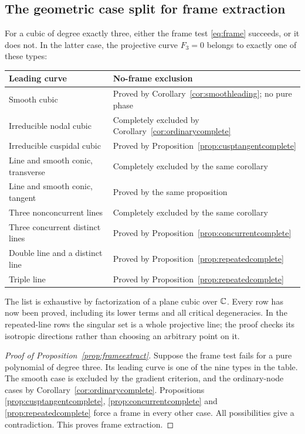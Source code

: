\subsection{The geometric case split for frame extraction}

For a cubic of degree exactly three, either the frame test
\eqref{eq:frame} succeeds, or it does not. In the latter case,
the projective curve $F_3=0$ belongs to exactly one of these types:
\begin{center}\small
\begin{tabular}{@{}p{}p{}@{}}
\toprule
Leading curve & No-frame exclusion\\
\midrule
Smooth cubic & Proved by Corollary~\ref{cor:smoothleading}; no pure phase\\
Irreducible nodal cubic & Completely excluded by Corollary~\ref{cor:ordinarycomplete}\\
Irreducible cuspidal cubic & Proved by Proposition~\ref{prop:cusptangentcomplete}\\
Line and smooth conic, transverse & Completely excluded by the same corollary\\
Line and smooth conic, tangent & Proved by the same proposition\\
Three nonconcurrent lines & Completely excluded by the same corollary\\
Three concurrent distinct lines & Proved by Proposition~\ref{prop:concurrentcomplete}\\
Double line and a distinct line & Proved by Proposition~\ref{prop:repeatedcomplete}\\
Triple line & Proved by Proposition~\ref{prop:repeatedcomplete}\\
\bottomrule
\end{tabular}
\end{center}
The list is exhaustive by factorization of a plane cubic over $\mathbb C$.
Every row has now been proved, including its lower terms and all
critical degeneracies. In the repeated-line rows the singular set
is a whole projective line; the proof checks its isotropic directions
rather than choosing an arbitrary point on it.

\begin{proof}[Proof of Proposition~\ref{prop:frameextract}]
Suppose the frame test fails for a pure polynomial of degree three.
Its leading curve is one of the nine types in the table. The smooth
case is excluded by the gradient criterion, and the ordinary-node
cases by Corollary~\ref{cor:ordinarycomplete}. Propositions
\ref{prop:cusptangentcomplete}, \ref{prop:concurrentcomplete} and
\ref{prop:repeatedcomplete} force a frame in every other case.
All possibilities give a contradiction. This proves frame extraction.
\end{proof}
